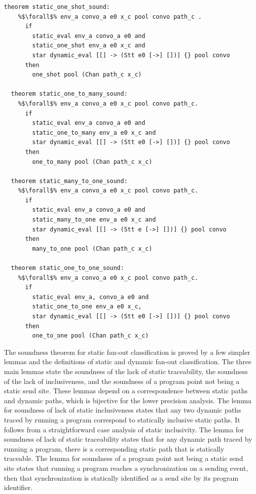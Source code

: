 \documentclass{article}
\begin{document}
\begin{lstlisting}[language=logic, escapechar=\%]
  theorem static_one_shot_sound: 
    %$\forall$% env_a convo_a e0 x_c pool convo path_c .
      if
        static_eval env_a convo_a e0 and 
        static_one_shot env_a e0 x_c and 
        star dynamic_eval [[] -> (Stt e0 [->] [])] {} pool convo
      then
        one_shot pool (Chan path_c x_c)

  theorem static_one_to_many_sound:
    %$\forall$% env_a convo_a e0 x_c pool convo path_c. 
      if 
        static_eval env_a convo_a e0 and 
        static_one_to_many env_a e0 x_c and 
        star dynamic_eval [[] -> (Stt e0 [->] [])] {} pool convo
      then
        one_to_many pool (Chan path_c x_c)

  theorem static_many_to_one_sound:
    %$\forall$% env_a convo_a e0 x_c pool convo path_c. 
      if
        static_eval env_a convo_a e0 and 
        static_many_to_one env_a e0 x_c and 
        star dynamic_eval [[] -> (Stt e [->] [])] {} pool convo
      then
        many_to_one pool (Chan path_c x_c)

  theorem static_one_to_one_sound:
    %$\forall$% env_a convo_a e0 x_c pool convo path_c. 
      if
        static_eval env_a, convo_a e0 and 
        static_one_to_one env_a e0 x_c,
        star dynamic_eval [[] -> (Stt e0 [->] [])] {} pool convo
      then
        one_to_one pool (Chan path_c x_c)
\end{lstlisting}

The soundness theorem for static fan-out classification is proved
by a few simpler lemmas and the
definitions of static and dynamic fan-out classification.  The three main lemmas state the
soundness of the lack of static traceability, the soundness of the lack of inclusiveness, and
the soundness of a program point not being a static send site. These lemmas depend on a
correspondence between static paths and dynamic paths, which is bijective for the lower
precision analysis. The lemma for soundness of lack of static inclusiveness states that any two
dynamic paths traced by running a program correspond to statically inclusive static paths. It
follows from a straightforward case analysis of static inclusivity. The lemma for soundness of
lack of static traceability states that for any dynamic path traced by running a program, there
is a corresponding static path that is statically traceable. The lemma for soundness of a
program point not being a static send site states that running a program reaches a
synchronization on a sending event, then that synchronization is statically identified as a
send site by its program identifier.
\end{document}
